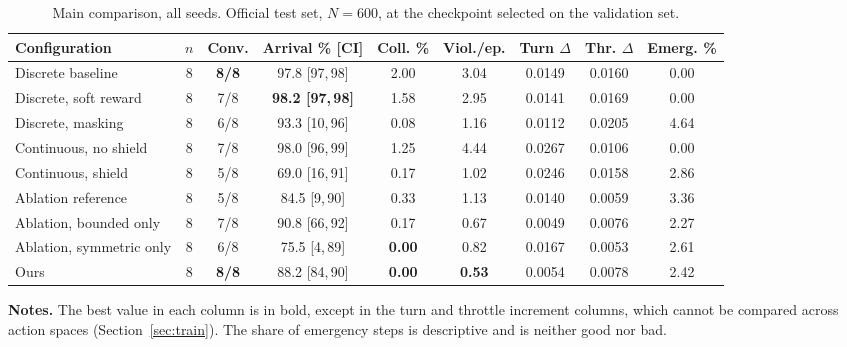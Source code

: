 \documentclass[10pt,letterpaper]{article}
\newcommand{\capsize}{\fontsize{10}{12}\selectfont}
\newcommand{\capnote}[1]{{\normalfont\capsize #1}}
\begin{document}
\begin{table}[htbp]
 \caption{Main comparison, all seeds. \capnote{Official test set, $N=600$, at the
 checkpoint selected on the validation set.}}
 \label{tab:main}
 \centering\capsize
 \setlength{\tabcolsep}{4pt}
 \begin{tabular*}{\linewidth}{@{\extracolsep{\fill}}lcccccccc@{}}
  \toprule
  Configuration & $n$ & Conv. & Arrival \% [CI] & Coll. \% & Viol./ep. & Turn $\Delta$ & Thr. $\Delta$ & Emerg. \% \\
  \midrule
  Discrete baseline         & 8 & \textbf{8/8} & 97.8 [97,\,98] & 2.00 & 3.04 & 0.0149 & 0.0160 & 0.00 \\
  Discrete, soft reward     & 8 & 7/8 & \textbf{98.2 [97,\,98]} & 1.58 & 2.95 & 0.0141 & 0.0169 & 0.00 \\
  Discrete, masking         & 8 & 6/8 & 93.3 [10,\,96] & 0.08 & 1.16 & 0.0112 & 0.0205 & 4.64 \\
  Continuous, no shield     & 8 & 7/8 & 98.0 [96,\,99] & 1.25 & 4.44 & 0.0267 & 0.0106 & 0.00 \\
  Continuous, shield        & 8 & 5/8 & 69.0 [16,\,91] & 0.17 & 1.02 & 0.0246 & 0.0158 & 2.86 \\
  Ablation reference        & 8 & 5/8 & 84.5 [9,\,90] & 0.33 & 1.13 & 0.0140 & 0.0059 & 3.36 \\
  Ablation, bounded only    & 8 & 7/8 & 90.8 [66,\,92] & 0.17 & 0.67 & 0.0049 & 0.0076 & 2.27 \\
  Ablation, symmetric only  & 8 & 6/8 & 75.5 [4,\,89] & \textbf{0.00} & 0.82 & 0.0167 & 0.0053 & 2.61 \\
  Ours                      & 8 & \textbf{8/8} & 88.2 [84,\,90] & \textbf{0.00} & \textbf{0.53} & 0.0054 & 0.0078 & 2.42 \\
  \bottomrule
 \end{tabular*}

 \vspace{4pt}
 \begin{minipage}{\linewidth}\capsize
 \textbf{Notes.} The best value in each column is in bold, except in the turn and throttle increment
columns, which cannot be compared across action spaces (Section~\ref{sec:train}). The share of emergency steps is descriptive and is neither good
 nor bad.
 \end{minipage}
\end{table}
\end{document}

